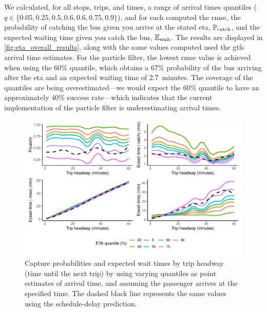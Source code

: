 We calculated, for all stops, trips, and times, a range of arrival times quantiles ($q \in \{0.05, 0.25, 0.5, 0.6, 0.6, 0.75, 0.9\}$), and for each computed the \gls{rmse}, the probability of catching the bus given you arrive at the stated \gls{eta}, $\mathbb{P}_\text{catch}$, and the expected waiting time given you catch the bus, $\mathbb{E}_\text{wait}$. The results are displayed in \cref{fig:eta_overall_results}, along with the same values computed used the \gls{gtfs} arrival time estimates. For the particle filter, the lowest \gls{rmse} value is achieved when using the 60\% quantile, which obtains a 67\% probability of the bus arriving after the \gls{eta} and an expected waiting time of 2.7~minutes. The coverage of the quantiles are being overestimated---we would expect the 60\% quantile to have an approximately 40\% success rate---which indicates that the current implementation of the particle filter is underestimating arrival times.


\begin{knitrout}\small
{}\color{fgcolor}\begin{figure}

{\centering \includegraphics[width=\textwidth]{figure/eta_headway_results-1} 

}

\caption[Capture probabilities and expected wait times by trip headway (time until the next trip) by using varying quantiles as point estimates of arrival time, and assuming the passenger arrives at the specified time]{Capture probabilities and expected wait times by trip headway (time until the next trip) by using varying quantiles as point estimates of arrival time, and assuming the passenger arrives at the specified time. The dashed black line represents the same values using the schedule-delay prediction.}\label{fig:eta_headway_results}
\end{figure}


\end{knitrout}


